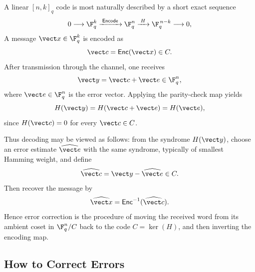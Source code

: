 \newpage
\begin{flushleft}\color{blue}
\begin{note}
A linear \([n,k]_q\) code is most naturally described by a short exact sequence \[
0 \longrightarrow \F_q^k \xrightarrow{\;\mathsf{Encode}\;} \F_q^n \xrightarrow{\;H\;} \F_q^{\,n-k} \longrightarrow 0,
\]
A message \(\vect x\in \F_q^k\) is encoded as
\[
\vect c=\mathsf{Enc}(\vect x)\in C.
\]
After transmission through the channel, one receives
\[
\vect y=\vect c+\vect e \in \F_q^n,
\]
where \(\vect e\in \F_q^n\) is the error vector. Applying the parity-check map yields
\[
H(\vect y)=H(\vect c+\vect e)=H(\vect e),
\]
since \(H(\vect c)=0\) for every \(\vect c\in C\).

Thus decoding may be viewed as follows: from the syndrome \(H(\vect y)\), choose an error estimate \(\widehat{\vect e}\) with the same syndrome, typically of smallest Hamming weight, and define
\[
\widehat{\vect c}=\vect y-\widehat{\vect e}\in C.
\]
Then recover the message by
\[
\widehat{\vect x}=\mathsf{Enc}^{-1}(\widehat{\vect c}).
\]
Hence error correction is the procedure of moving the received word from its ambient coset in \(\F_q^n/C\) back to the code \(C=\ker(H)\), and then inverting the encoding map.

\end{note}
\end{flushleft}

\newpage
\subsection{How to Correct Errors}






